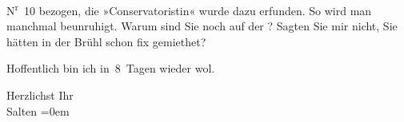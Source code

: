                   N\textsuperscript{r} 10 bezogen, die »Conservatoristin« wurde dazu
               erfunden. So wird man manchmal beunruhigt. Warum sind Sie noch auf der \label{K_L03324-3v}\label{K_L03324-3}? Sagten Sie mir nicht, Sie hätten in der Brühl schon fix gemiethet?\pend
           
\pstart
           Hoffentlich bin ich in 8 Tagen wieder wol.\pend
           
\pstart
           Herzlichst Ihr{\\[\baselineskip]}\spacefill\mbox{Salten}\pend
           \leftskip=0em{}\endnumbering{}  \newcommand{\dateiname}{L03324}\newcommand{\titel}{Felix Salten an Arthur Schnitzler, [10?. 3. 1902]}\newcommand{\editorInnen}{Martin Anton Müller und Laura Untner}
